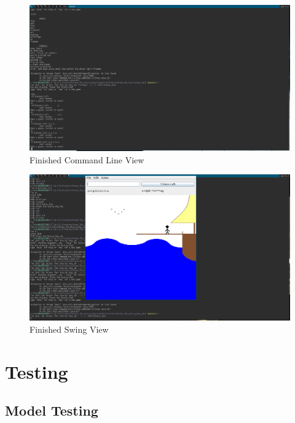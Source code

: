 \documentclass[a4paper, 11pt]{article}
\begin{document}
\begin{landscape}

\begin{figure}[H]
\centering
\includegraphics[scale=0.5]{./res/CliView.png}
\caption{Finished Command Line View}
\label{CliViewFinished}
\end{figure}

\begin{figure}[H]
\centering
\includegraphics[scale=0.5]{./res/SwingView.png}
\caption{Finished Swing View}
\label{SwingViewFinished}
\end{figure}

\section{Testing}

\subsection{Model Testing}


\end{landscape}
\end{document}
